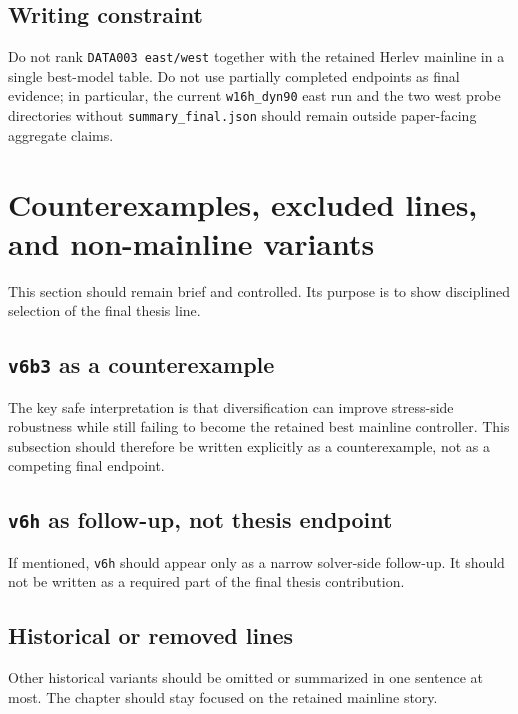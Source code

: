 \subsection{Writing constraint}
\label{sec:results-data003-constraint}

Do not rank \texttt{DATA003 east/west} together with the retained Herlev mainline in a single best-model table.
Do not use partially completed endpoints as final evidence; in particular, the current \texttt{w16h\_dyn90} east run and the two west probe directories without \texttt{summary\_final.json} should remain outside paper-facing aggregate claims.

\section{Counterexamples, excluded lines, and non-mainline variants}
\label{sec:results-counterexamples}

This section should remain brief and controlled.
Its purpose is to show disciplined selection of the final thesis line.

\subsection{\texttt{v6b3} as a counterexample}
\label{sec:results-v6b3}

The key safe interpretation is that diversification can improve stress-side robustness while still failing to become the retained best mainline controller.
This subsection should therefore be written explicitly as a counterexample, not as a competing final endpoint.

\subsection{\texttt{v6h} as follow-up, not thesis endpoint}
\label{sec:results-v6h}

If mentioned, \texttt{v6h} should appear only as a narrow solver-side follow-up.
It should not be written as a required part of the final thesis contribution.

\subsection{Historical or removed lines}
\label{sec:results-historical-lines}

Other historical variants should be omitted or summarized in one sentence at most.
The chapter should stay focused on the retained mainline story.

